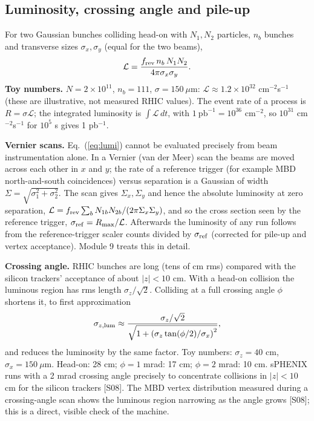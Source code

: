 \documentclass[11pt,letterpaper]{article}
\begin{document}
\subsection{Luminosity, crossing angle and pile-up}
For two Gaussian bunches colliding head-on with $N_1,N_2$ particles, $n_b$ bunches and transverse sizes $\sigma_x,\sigma_y$
(equal for the two beams),
\begin{equation}
\mathcal L=\frac{f_{\rm rev}\,n_b\,N_1N_2}{4\pi\sigma_x\sigma_y}.
\label{eq:lumi}
\end{equation}
\textbf{Toy numbers.} $N=2\times10^{11}$, $n_b=111$, $\sigma=150\ \mu$m: $\mathcal L\approx1.2\times10^{32}$ cm$^{-2}$s$^{-1}$
(these are illustrative, not measured RHIC values). The event rate of a process is $R=\sigma\mathcal L$; the integrated
luminosity is $\int\mathcal L\,dt$, with $1\ \mathrm{pb}^{-1}=10^{36}$ cm$^{-2}$, so $10^{31}$ cm$^{-2}$s$^{-1}$ for $10^5$ s gives 1 pb$^{-1}$.

\textbf{Vernier scans.} Eq.~(\ref{eq:lumi}) cannot be evaluated precisely from beam instrumentation alone. In a Vernier
(van der Meer) scan the beams are moved across each other in $x$ and $y$; the rate of a reference trigger (for example MBD
north-and-south coincidences) versus separation is a Gaussian of width $\Sigma=\sqrt{\sigma_1^2+\sigma_2^2}$. The scan gives
$\Sigma_x,\Sigma_y$ and hence the absolute luminosity at zero separation,
$\mathcal L=f_{\rm rev}\sum_b N_{1b}N_{2b}/(2\pi\Sigma_x\Sigma_y)$, and so the cross section seen by the reference trigger,
$\sigma_{\rm ref}=R_{\rm max}/\mathcal L$. Afterwards the luminosity of any run follows from the reference-trigger scaler
counts divided by $\sigma_{\rm ref}$ (corrected for pile-up and vertex acceptance). Module 9 treats this in detail.

\textbf{Crossing angle.} RHIC bunches are long (tens of cm rms) compared with the silicon trackers' acceptance of about
$|z|<10$ cm. With a head-on collision the luminous region has rms length $\sigma_z/\sqrt2$. Colliding at a full crossing angle
$\phi$ shortens it, to first approximation
\begin{equation}
\sigma_{z,\rm lum}\approx\frac{\sigma_z/\sqrt2}{\sqrt{1+\left(\sigma_z\tan(\phi/2)/\sigma_x\right)^2}},
\end{equation}
and reduces the luminosity by the same factor. Toy numbers: $\sigma_z=40$ cm, $\sigma_x=150\ \mu$m. Head-on: 28 cm;
$\phi=1$ mrad: 17 cm; $\phi=2$ mrad: 10 cm. sPHENIX runs with a 2 mrad crossing angle precisely to concentrate collisions
in $|z|<10$ cm for the silicon trackers [S08]. The MBD vertex distribution measured during a crossing-angle scan shows the
luminous region narrowing as the angle grows [S08]; this is a direct, visible check of the machine.
\end{document}
